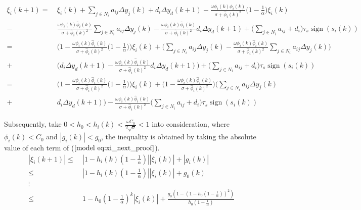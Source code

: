 \documentclass[journal,onecolumn]{IEEEtran}
\begin{document}
\begin{align}
    \label{model eq:xi_next_proof}
    \xi_i(k+1) = \ &  \xi_i(k) + \sum_{j \in N_i}a_{ij} \Delta y_j(k) + d_i \Delta y_d(k+1) - \frac{\omega \phi_i(k) \hat{\phi}_i(k)}{\sigma + \hat{\phi}_i(k)^2} \big(1 - \frac{1}{\alpha}\big) \xi_i(k) \quad \nonumber \\
    - \ & \frac{\omega \phi_i(k) \hat{\phi}_i(k)}{\sigma + \hat{\phi}_i(k)^2} \sum_{j \in N_i}a_{ij} \Delta y_j(k) - \frac{\omega \phi_i(k) \hat{\phi}_i(k)}{\sigma + \hat{\phi}_i(k)^2} d_i \Delta y_d(k+1) + \bigg( \sum_{j \in N_i}a_{ij} + d_i \bigg) \tau_s \operatorname{sign}(s_i(k)) \quad \nonumber \\
    = \ & \bigg( 1 - \frac{\omega \phi_i(k) \hat{\phi}_i(k)}{\sigma + \hat{\phi}_i(k)^2} \big(1 - \frac{1}{\alpha}\big) \bigg) \xi_i(k) + \bigg( \sum_{j \in N_i}a_{ij} \Delta y_j(k) - \frac{\omega \phi_i(k) \hat{\phi}_i(k)}{\sigma + \hat{\phi}_i(k)^2} \sum_{j \in N_i}a_{ij} \Delta y_j(k) \bigg) \quad \nonumber \\
    + \ & \bigg( d_i \Delta y_d(k+1) - \frac{\omega \phi_i(k) \hat{\phi}_i(k)}{\sigma + \hat{\phi}_i(k)^2} d_i \Delta y_d(k+1) \bigg) + \bigg( \sum_{j \in N_i}a_{ij} + d_i \bigg) \tau_s \operatorname{sign}(s_i(k)) \quad \nonumber \\
    = \ & \bigg( 1 - \frac{\omega \phi_i(k) \hat{\phi}_i(k)}{\sigma + \hat{\phi}_i(k)^2} \big(1 - \frac{1}{\alpha}\big) \bigg) \xi_i(k) + \bigg( 1 - \frac{\omega \phi_i(k) \hat{\phi}_i(k)}{\sigma + \hat{\phi}_i(k)^2} \bigg) \bigg( \sum_{j \in N_i}a_{ij} \Delta y_j(k)  \quad \nonumber \\
    + \ &  d_i \Delta y_d(k+1) \bigg) - \frac{\omega \phi_i(k) \hat{\phi}_i(k)}{\sigma + \hat{\phi}_i(k)^2} \bigg( \sum_{j \in N_i}a_{ij} + d_i \bigg) \tau_s \operatorname{sign}(s_i(k))
\end{align}

Subsequently, take $ 0<h_0<h_i(k)<\frac{\omega C_0}{2\sqrt{\sigma}}<1 $ into consideration, where $ \phi_i(k) < C_0 $ and $ |g_i(k)|<g_0 $, the inequality is obtained by taking the absolute value of each term of ($ \ref{model eq:xi_next_proof} $).
\begin{align}
    \label{model:absolute2}
    |\xi_i(k+1)| \leq \ & |1-h_i(k)(1-\frac{1}{ \alpha })| |\xi_i(k)| + |g_i(k)| \quad \nonumber \\
    \leq \ & |1-h_i(k)(1-\frac{1}{\alpha })| |\xi_i(k)| + g_0(k) \quad \nonumber \\
    \vdots \nonumber \\
    \leq \ & 1-h_0(1-\frac{1}{\alpha })^k |\xi_i(k)| + \frac{g_0(1-(1-h_0(1-\frac{1}{\alpha}))^2)}{h_0(1-\frac{1}{ \alpha})}
\end{align}
\end{document}
